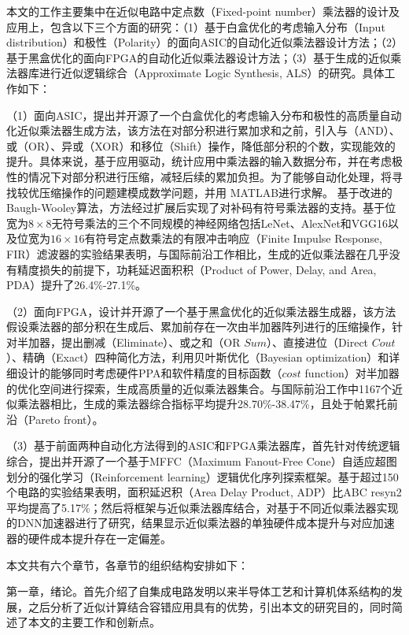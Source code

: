 本文的工作主要集中在近似电路中定点数（Fixed-point number）乘法器的设计及应用上，包含以下三个方面的研究：（1）基于白盒优化的考虑输入分布（Input distribution）和极性（Polarity）的面向ASIC的自动化近似乘法器设计方法；（2）基于黑盒优化的面向FPGA的自动化近似乘法器设计方法；（3）基于生成的近似乘法器库进行近似逻辑综合（Approximate Logic Synthesis, ALS）\cite{AC:ALS:survey}的研究。具体工作如下：

（1）面向ASIC，提出并开源了一个白盒优化的考虑输入分布和极性的高质量自动化近似乘法器生成方法，该方法在对部分积进行累加求和之前，引入与（AND）、或（OR）、异或（XOR）和移位（Shift）操作，降低部分积的个数，实现能效的提升。具体来说，基于应用驱动，统计应用中乘法器的输入数据分布，并在考虑极性的情况下对部分积进行压缩，减轻后续的累加负担。为了能够自动化处理，将寻找较优压缩操作的问题建模成数学问题，并用 MATLAB进行求解。
基于改进的Baugh-Wooley算法\cite{EM:baugh-wooley,EM:baugh-wooley_modified_PP_reorga,EM:baugh-wooley_diff}，方法经过扩展后实现了对补码有符号乘法器的支持。基于位宽为$8\times8$无符号乘法的三个不同规模的神经网络包括LeNet、AlexNet和VGG16以及位宽为$16\times16$有符号定点数乘法的有限冲击响应（Finite Impulse Response, FIR）滤波器的实验结果表明，与国际前沿工作相比，生成的近似乘法器在几乎没有精度损失的前提下，功耗延迟面积积（Product of Power, Delay, and Area, PDA）提升了26.4\%-27.1\%。

（2）面向FPGA，设计并开源了一个基于黑盒优化的近似乘法器生成器，该方法假设乘法器的部分积在生成后、累加前存在一次由半加器阵列进行的压缩操作，针对半加器，提出删减（Eliminate）、或之和（OR $Sum$）、直接进位（Direct $Cout$）、精确（Exact）四种简化方法，利用贝叶斯优化（Bayesian optimization）和详细设计的能够同时考虑硬件PPA和软件精度的目标函数（$cost$ function）对半加器的优化空间进行探索，生成高质量的近似乘法器集合。与国际前沿工作中1167个近似乘法器相比，生成的乘法器综合指标平均提升28.70\%-38.47\%，且处于帕累托前沿（Pareto front）。

（3）基于前面两种自动化方法得到的ASIC和FPGA乘法器库，首先针对传统逻辑综合，提出并开源了一个基于MFFC（Maximum Fanout-Free Cone）自适应超图划分的强化学习（Reinforcement learning）逻辑优化序列探索框架。基于超过150个电路的实验结果表明，面积延迟积（Area Delay Product, ADP）比ABC\cite{LS:ABC} resyn2平均提高了5.17\%；然后将框架与近似乘法器库结合，对基于不同近似乘法器实现的DNN加速器进行了研究，结果显示近似乘法器的单独硬件成本提升与对应加速器的硬件成本提升存在一定偏差。

本文共有六个章节，各章节的组织结构安排如下：

第一章，绪论。首先介绍了自集成电路发明以来半导体工艺和计算机体系结构的发展，之后分析了近似计算结合容错应用具有的优势，引出本文的研究目的，同时简述了本文的主要工作和创新点。

